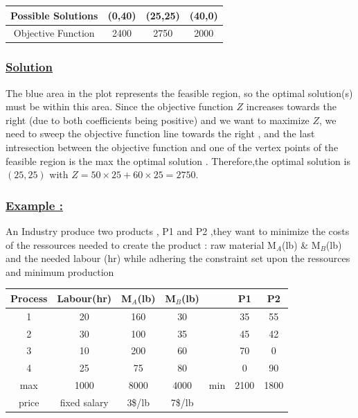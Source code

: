 \vspace{0.75cm} 
\begin{center}
    \begin{tabular}{|c|c|c|c|}
        \hline 
        Possible Solutions  & (0,40) & (25,25) & (40,0) \\
        \hline 
        Objective Function & 2400 & 2750 & 2000 \\
        \hline 
    \end{tabular}
\end{center}
\vspace{1cm}
\subsubsection*{\underline{Solution}}

The blue area in the plot represents the feasible region, so the optimal solution(s) must be within this area. Since
the objective function \( Z \) increases towards the right (due to both coefficients being positive) and we want to
maximize \( Z \), we need to sweep the objective function line towards the right , and the last intresection 
between the objective function and one of the vertex points of the feasible region is the max the optimal solution . 
Therefore,the optimal solution is \((25, 25)\) with \( Z = 50 \times 25 + 60 \times 25 = 2750 \).

\newpage
\subsubsection*{\underline{Example :}}An Industry produce two products , P1 and P2 ,they want to minimize the costs
of the ressources needed to create the product : raw material M$_{A}$(lb) \& M$_{B}$(lb) and the needed labour (hr)
while adhering the constraint set upon the ressources and minimum production 

\vspace{0.75cm} 
\begin{center}
    \begin{tabular}{|c|c|c|c|c|c|c|}
        \hline 
        Process  & Labour(hr) & M$_{A}$(lb) & M$_{B}$(lb)& & P1 & P2 \\
        \hline 
        1 & 20 & 160 & 30 & &35 & 55 \\
        \hline 
        2 & 30 & 100 & 35 & &45 & 42 \\
        \hline 
        3 & 10 & 200 & 60 & &70 & 0 \\
        \hline
        4 & 25 & 75 & 80 & &0 & 90\\
        \hline
        max & 1000 & 8000 & 4000 & min & 2100 & 1800\\
        \hline
        price & fixed salary & 3\$/lb & 7\$/lb & & & \\
        \hline
    \end{tabular}
\end{center}

